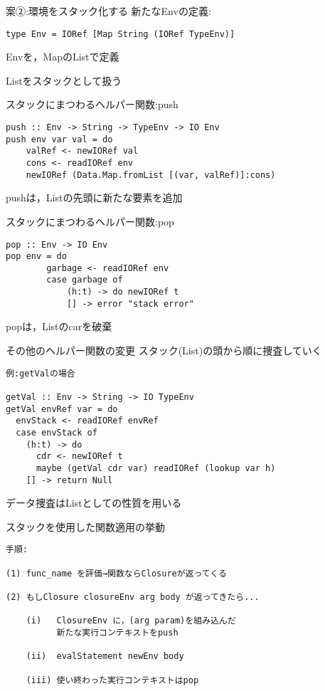 \documentclass[uplatex,dvipdfmx,ja=standard]{beamer}
\begin{document}
\begin{frame}[fragile]{案②:環境をスタック化する}
    新たなEnvの定義:
    \begin{verbatim}
type Env = IORef [Map String (IORef TypeEnv)]
    \end{verbatim}
Envを，MapのListで定義

Listをスタックとして扱う
\end{frame}

\begin{frame}[fragile]{スタックにまつわるヘルパー関数:push}
    \begin{verbatim}
push :: Env -> String -> TypeEnv -> IO Env 
push env var val = do
    valRef <- newIORef val
    cons <- readIORef env
    newIORef (Data.Map.fromList [(var, valRef)]:cons)
    \end{verbatim}
pushは，Listの先頭に新たな要素を追加
\end{frame}


\begin{frame}[fragile]{スタックにまつわるヘルパー関数:pop}
    \begin{verbatim}
pop :: Env -> IO Env 
pop env = do
        garbage <- readIORef env
        case garbage of
            (h:t) -> do newIORef t
            [] -> error "stack error"
    \end{verbatim}
popは，Listのcarを破棄
\end{frame}

\begin{frame}[fragile]{その他のヘルパー関数の変更}
スタック(List)の頭から順に捜査していく

    \begin{verbatim}
例:getValの場合

getVal :: Env -> String -> IO TypeEnv
getVal envRef var = do
  envStack <- readIORef envRef
  case envStack of
    (h:t) -> do
      cdr <- newIORef t
      maybe (getVal cdr var) readIORef (lookup var h)
    [] -> return Null
    \end{verbatim}
データ捜査はListとしての性質を用いる
\end{frame}

\begin{frame}[fragile]{スタックを使用した関数適用の挙動}
    \begin{verbatim}
手順:

(1) func_name を評価→関数ならClosureが返ってくる 

(2) もしClosure closureEnv arg body が返ってきたら...

    (i)   ClosureEnv に，(arg param)を組み込んだ
          新たな実行コンテキストをpush 

    (ii)  evalStatement newEnv body

    (iii) 使い終わった実行コンテキストはpop
    \end{verbatim}
\end{frame}
\end{document}

